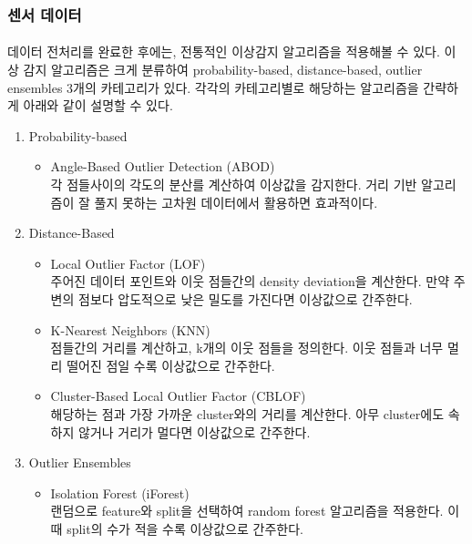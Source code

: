 \documentclass[11pt]{article}
\begin{document}
    \subsubsection{센서 데이터}

    \paragraph {} 데이터 전처리를 완료한 후에는, 전통적인 이상감지 알고리즘을 적용해볼 수 있다. 이상 감지 알고리즘은 크게 분류하여 probability-based, distance-based, outlier ensembles 3개의 카테고리가 있다. 각각의 카테고리별로 해당하는 알고리즘을 간략하게 아래와 같이 설명할 수 있다\citep{de2020detecting}.
    
    \begin{enumerate}
        \item {Probability-based}
        \begin{itemize}
            \item {Angle-Based Outlier Detection (ABOD)} \\
            각 점들사이의 각도의 분산를 계산하여 이상값을 감지한다. 거리 기반 알고리즘이 잘 풀지 못하는 고차원 데이터에서 활용하면 효과적이다.
        \end{itemize}
    
        \item {Distance-Based}
        \begin{itemize}
            \item {Local Outlier Factor (LOF)} \\
            주어진 데이터 포인트와 이웃 점들간의 density deviation을 계산한다. 만약 주변의 점보다 압도적으로 낮은 밀도를 가진다면 이상값으로 간주한다.
            \item {K-Nearest Neighbors (KNN)} \\
            점들간의 거리를 계산하고, k개의 이웃 점들을 정의한다. 이웃 점들과 너무 멀리 떨어진 점일 수록 이상값으로 간주한다.
            \item {Cluster-Based Local Outlier Factor (CBLOF)} \\
            해당하는 점과 가장 가까운 cluster와의 거리를 계산한다. 아무 cluster에도 속하지 않거나 거리가 멀다면 이상값으로 간주한다.
        \end{itemize}
    
        \item {Outlier Ensembles}
        \begin{itemize}
            \item {Isolation Forest (iForest)} \\
            랜덤으로 feature와 split을 선택하여 random forest 알고리즘을 적용한다. 이 때 split의 수가 적을 수록 이상값으로 간주한다.
        \end{itemize}
    \end{enumerate}
\end{document}
